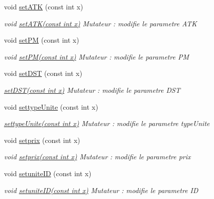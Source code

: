 \begin{DoxyCompactItemize}
void \hyperlink{classUnite_a7db327364ab9f7461b180eb1fc868201}{set\+A\+TK} (const int x)
\begin{DoxyCompactList}\small\item\em void \hyperlink{classUnite_a7db327364ab9f7461b180eb1fc868201}{set\+A\+T\+K(const int x)} Mutateur \+: modifie le parametre A\+TK \end{DoxyCompactList}\item 
void \hyperlink{classUnite_a5dca4c2dbdd1c04cfea83432bfc5cb0c}{set\+PM} (const int x)
\begin{DoxyCompactList}\small\item\em void \hyperlink{classUnite_a5dca4c2dbdd1c04cfea83432bfc5cb0c}{set\+P\+M(const int x)} Mutateur \+: modifie le parametre PM \end{DoxyCompactList}\item 
void \hyperlink{classUnite_a1ce6139f2b1f39c45db45f47967d3657}{set\+D\+ST} (const int x)
\begin{DoxyCompactList}\small\item\em \hyperlink{classUnite_a1ce6139f2b1f39c45db45f47967d3657}{set\+D\+S\+T(const int x)} Mutateur \+: modifie le parametre D\+ST \end{DoxyCompactList}\item 
void \hyperlink{classUnite_ab7eeb92b4a50730a7b17cb83c878b3ce}{settype\+Unite} (const int x)
\begin{DoxyCompactList}\small\item\em \hyperlink{classUnite_ab7eeb92b4a50730a7b17cb83c878b3ce}{settype\+Unite(const int x)} Mutateur \+: modifie le parametre type\+Unite \end{DoxyCompactList}\item 
void \hyperlink{classUnite_a220586f6fbb6f382ae060f09e0388228}{setprix} (const int x)
\begin{DoxyCompactList}\small\item\em void \hyperlink{classUnite_a220586f6fbb6f382ae060f09e0388228}{setprix(const int x)} Mutateur \+: modifie le parametre prix \end{DoxyCompactList}\item 
void \hyperlink{classUnite_aa948cfc472bb1063089b5663ddf3cd05}{setunite\+ID} (const int x)
\begin{DoxyCompactList}\small\item\em void \hyperlink{classUnite_aa948cfc472bb1063089b5663ddf3cd05}{setunite\+I\+D(const int x)} Mutateur \+: modifie le parametre ID \end{DoxyCompactList}\item 

\end{DoxyCompactItemize}
